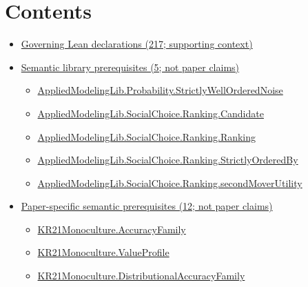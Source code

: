 \documentclass[10pt]{article}
\begin{document}
\section*{Contents}
\begin{itemize}[leftmargin=1.2em]
\item \hyperlink{governing-declaration-section-5ef5ef0364b6939c}{Governing Lean declarations (217; supporting context)}
\item \hyperlink{library-section-227ed3312974d38f}{Semantic library prerequisites (5; not paper claims)}
\begin{itemize}[leftmargin=1.2em]
\item \hyperlink{library-prerequisite-e3e4ea40c502ab9c}{Applied\allowbreak{}Modeling\allowbreak{}Lib.\allowbreak{}Probability.\allowbreak{}Strictly\allowbreak{}Well\allowbreak{}Ordered\allowbreak{}Noise}
\item \hyperlink{library-prerequisite-8c0e6c25845ae78a}{Applied\allowbreak{}Modeling\allowbreak{}Lib.\allowbreak{}Social\allowbreak{}Choice.\allowbreak{}Ranking.\allowbreak{}Candidate}
\item \hyperlink{library-prerequisite-5cde54446d1ae021}{Applied\allowbreak{}Modeling\allowbreak{}Lib.\allowbreak{}Social\allowbreak{}Choice.\allowbreak{}Ranking.\allowbreak{}Ranking}
\item \hyperlink{library-prerequisite-3585717d1635654a}{Applied\allowbreak{}Modeling\allowbreak{}Lib.\allowbreak{}Social\allowbreak{}Choice.\allowbreak{}Ranking.\allowbreak{}Strictly\allowbreak{}Ordered\allowbreak{}By}
\item \hyperlink{library-prerequisite-21bd2a45ab961ae4}{Applied\allowbreak{}Modeling\allowbreak{}Lib.\allowbreak{}Social\allowbreak{}Choice.\allowbreak{}Ranking.\allowbreak{}second\allowbreak{}Mover\allowbreak{}Utility}
\end{itemize}
\item \hyperlink{paper-prerequisite-section-5ef5ef0364b6939c}{Paper-specific semantic prerequisites (12; not paper claims)}
\begin{itemize}[leftmargin=1.2em]
\item \hyperlink{paper-prerequisite-a1353b2b1b6f0303}{KR21\allowbreak{}Monoculture.\allowbreak{}Accuracy\allowbreak{}Family}
\item \hyperlink{paper-prerequisite-c0e41e9b0e843969}{KR21\allowbreak{}Monoculture.\allowbreak{}Value\allowbreak{}Profile}
\item \hyperlink{paper-prerequisite-ee564fa2921e1add}{KR21\allowbreak{}Monoculture.\allowbreak{}Distributional\allowbreak{}Accuracy\allowbreak{}Family}

\end{itemize}
\end{itemize}
\end{document}
